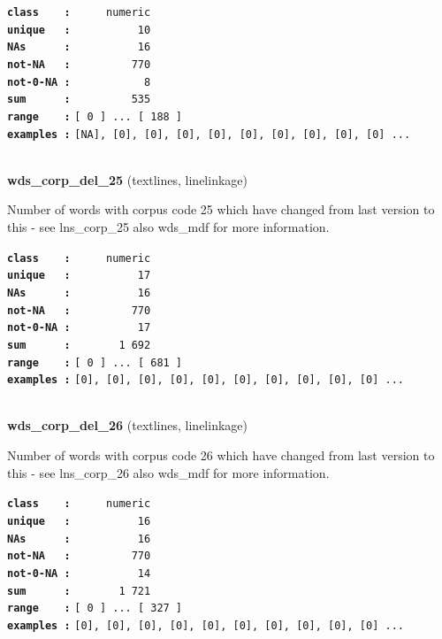 \documentclass[]{article}
\begin{document}
\textbf{\texttt{class\ \ \ \ :}} \texttt{~~~~~numeric}\\
\textbf{\texttt{unique\ \ \ :}} \texttt{~~~~~~~~~~10}\\
\textbf{\texttt{NAs\ \ \ \ \ \ :}} \texttt{~~~~~~~~~~16}\\
\textbf{\texttt{not-NA\ \ \ :}} \texttt{~~~~~~~~~770}\\
\textbf{\texttt{not-0-NA\ :}} \texttt{~~~~~~~~~~~8}\\
\textbf{\texttt{sum\ \ \ \ \ \ :}} \texttt{~~~~~~~~~535}\\
\textbf{\texttt{range\ \ \ \ :}}
\texttt{{[}\ 0\ {]}\ ...\ {[}\ 188\ {]}}\\
\textbf{\texttt{examples\ :}}
\texttt{{[}NA{]},\ {[}0{]},\ {[}0{]},\ {[}0{]},\ {[}0{]},\ {[}0{]},\ {[}0{]},\ {[}0{]},\ {[}0{]},\ {[}0{]}\ ...}\\

~

\textbf{wds\_corp\_del\_25} (textlines, linelinkage)

Number of words with corpus code 25 which have changed from last version
to this - see lns\_corp\_25 also wds\_mdf for more information.

\textbf{\texttt{class\ \ \ \ :}} \texttt{~~~~~numeric}\\
\textbf{\texttt{unique\ \ \ :}} \texttt{~~~~~~~~~~17}\\
\textbf{\texttt{NAs\ \ \ \ \ \ :}} \texttt{~~~~~~~~~~16}\\
\textbf{\texttt{not-NA\ \ \ :}} \texttt{~~~~~~~~~770}\\
\textbf{\texttt{not-0-NA\ :}} \texttt{~~~~~~~~~~17}\\
\textbf{\texttt{sum\ \ \ \ \ \ :}} \texttt{~~~~~~~1~692}\\
\textbf{\texttt{range\ \ \ \ :}}
\texttt{{[}\ 0\ {]}\ ...\ {[}\ 681\ {]}}\\
\textbf{\texttt{examples\ :}}
\texttt{{[}0{]},\ {[}0{]},\ {[}0{]},\ {[}0{]},\ {[}0{]},\ {[}0{]},\ {[}0{]},\ {[}0{]},\ {[}0{]},\ {[}0{]}\ ...}\\

~

\textbf{wds\_corp\_del\_26} (textlines, linelinkage)

Number of words with corpus code 26 which have changed from last version
to this - see lns\_corp\_26 also wds\_mdf for more information.

\textbf{\texttt{class\ \ \ \ :}} \texttt{~~~~~numeric}\\
\textbf{\texttt{unique\ \ \ :}} \texttt{~~~~~~~~~~16}\\
\textbf{\texttt{NAs\ \ \ \ \ \ :}} \texttt{~~~~~~~~~~16}\\
\textbf{\texttt{not-NA\ \ \ :}} \texttt{~~~~~~~~~770}\\
\textbf{\texttt{not-0-NA\ :}} \texttt{~~~~~~~~~~14}\\
\textbf{\texttt{sum\ \ \ \ \ \ :}} \texttt{~~~~~~~1~721}\\
\textbf{\texttt{range\ \ \ \ :}}
\texttt{{[}\ 0\ {]}\ ...\ {[}\ 327\ {]}}\\
\textbf{\texttt{examples\ :}}
\texttt{{[}0{]},\ {[}0{]},\ {[}0{]},\ {[}0{]},\ {[}0{]},\ {[}0{]},\ {[}0{]},\ {[}0{]},\ {[}0{]},\ {[}0{]}\ ...}\\
\end{document}
